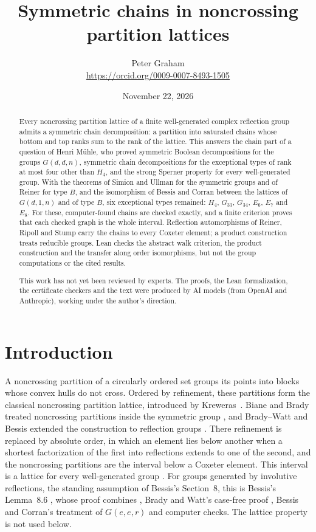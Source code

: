 \documentclass[11pt]{article}
\title{Symmetric chains in noncrossing partition lattices}
\author{Peter Graham\\ \small\url{https://orcid.org/0009-0007-8493-1505}}
\date{November 22, 2026}
\theoremstyle{definition}
\begin{document}
\maketitle
\begin{abstract}
Every noncrossing partition lattice of a finite well-generated complex
reflection group admits a symmetric chain decomposition: a partition
into saturated chains whose bottom and top ranks sum to the rank of the
lattice. This answers the chain part of a question of Henri M\"uhle,
who proved symmetric Boolean decompositions for the groups $G(d,d,n)$,
symmetric chain decompositions for the exceptional types of rank at
most four other than $H_4$, and the strong Sperner property for every
well-generated group. With the theorems of Simion and Ullman for the
symmetric groups and of Reiner for type $B$, and the isomorphism of
Bessis and Corran between the lattices of $G(d,1,n)$ and of type $B$, six
exceptional types remained: $H_4$, $G_{33}$, $G_{34}$, $E_6$, $E_7$
and $E_8$. For these, computer-found chains are checked exactly, and a
finite criterion proves that each checked graph is the whole interval.
Reflection
automorphisms of Reiner, Ripoll and Stump carry the chains to every
Coxeter element; a product construction treats reducible groups. Lean
checks the abstract walk criterion, the product construction and the
transfer along order isomorphisms, but not the group computations or
the cited results.

This work has not yet been reviewed by experts. The proofs, the Lean formalization, the certificate checkers and the text were produced by AI models (from OpenAI and Anthropic), working under the author's direction.
\end{abstract}
\medskip

\section{Introduction}
A noncrossing partition of a circularly ordered set groups its points
into blocks whose convex hulls do not cross. Ordered by refinement,
these partitions form the classical noncrossing partition lattice,
introduced by Kreweras~\cite{Kreweras}. Biane and Brady treated
noncrossing partitions inside the symmetric group \cite{Biane,Brady},
and Brady--Watt and Bessis extended the construction to reflection
groups \cite{BW,BessisDual}. There refinement is replaced by absolute
order, in which an element lies below another when a shortest
factorization of the first into reflections extends to one of the
second, and the noncrossing partitions are the interval below a
Coxeter element. This interval is a lattice for every well-generated
group \cite[introduction, first paragraph]{Muhle}. For groups generated
by involutive reflections, the standing assumption of Bessis's
Section~8, this is Bessis's Lemma~8.6 \cite[pp.~848 and~851]{Bessis},
whose proof combines \cite{BessisDual}, Brady and Watt's case-free proof
\cite{BW2008}, Bessis and Corran's treatment of $G(e,e,r)$ \cite{BC} and
computer checks. The lattice property is not used below.
\end{document}
